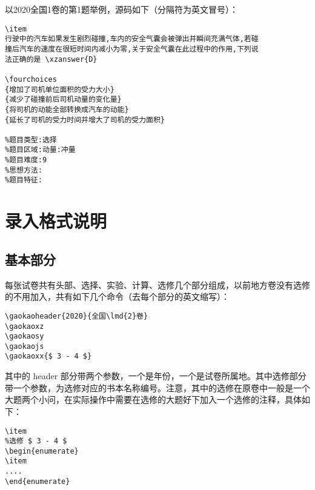 \documentclass{ctexbook}
\begin{document}
\noindent
以2020全国1卷的第1题举例，源码如下（分隔符为英文冒号）：
\begin{lstlisting}
\item
行驶中的汽车如果发生剧烈碰撞,车内的安全气囊会被弹出并瞬间充满气体,若碰
撞后汽车的速度在很短时间内减小为零,关于安全气囊在此过程中的作用,下列说
法正确的是 \xzanswer{D} 

\fourchoices
{增加了司机单位面积的受力大小}
{减少了碰撞前后司机动量的变化量}
{将司机的动能全部转换成汽车的动能}
{延长了司机的受力时间并增大了司机的受力面积}

%题目类型:选择
%题目区域:动量:冲量
%题目难度:9
%思想方法:
%题目特征:

\end{lstlisting}

\section{录入格式说明}
\subsection{基本部分}
每张试卷共有头部、选择、实验、计算、选修几个部分组成，以前地方卷没有选修的不用加入，共有如下几个命令（去每个部分的英文缩写）：
\begin{lstlisting}
\gaokaoheader{2020}{全国\lmd{2}卷}
\gaokaoxz
\gaokaosy
\gaokaojs
\gaokaoxx{$ 3 - 4 $}
\end{lstlisting}

其中的 header 部分带两个参数，一个是年份，一个是试卷所属地。其中选修部分带一个参数，为选修对应的书本名称编号。注意，其中的选修在原卷中一般是一个大题两个小问，在实际操作中需要在选修的大题好下加入一个选修的注释，具体如下：
\begin{lstlisting}
\item 
%选修 $ 3 - 4 $
\begin{enumerate}
\item
....
\end{enumerate}
\end{lstlisting}
\end{document}
